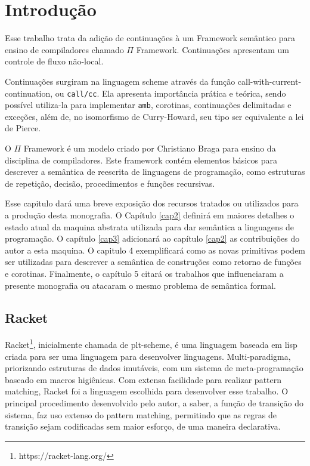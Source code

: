 \chapter{Introdução}


Esse trabalho trata da adição de continuações à um Framework semântico para ensino de compiladores chamado $\Pi$ Framework. Continuações apresentam um controle de fluxo não-local. 

Continuações surgiram na linguagem scheme através da função call-with-current-continuation, ou \texttt{call/cc}. Ela apresenta importância prática e teórica, sendo possível utiliza-la para implementar \texttt{amb}, corotinas, continuações delimitadas e exceções, além de, no isomorfismo de Curry-Howard, seu tipo ser equivalente a lei de Pierce.

O $\Pi$ Framework é um modelo criado por Christiano Braga para ensino da disciplina de compiladores. Este framework contém elementos básicos para descrever a semântica de reescrita de linguagens de programação, como estruturas de repetição, decisão, procedimentos e funções recursivas.

Esse capitulo dará uma breve exposição dos recursos tratados ou utilizados para a produção desta monografia. O Capítulo \ref{cap2} definirá em maiores detalhes o estado atual da maquina abstrata utilizada para dar semântica a linguagens de programação. O capítulo \ref{cap3} adicionará ao capítulo \ref{cap2} as contribuições do autor a esta maquina. O capitulo 4 exemplificará como as novas primitivas podem ser utilizadas para descrever a semântica de construções como retorno de funções e corotinas. Finalmente, o capítulo 5 citará os trabalhos que influenciaram a presente monografia ou atacaram o mesmo problema de semântica formal.

\section{Racket}
Racket\footnote{https://racket-lang.org/}, inicialmente chamada de plt-scheme, é uma linguagem baseada em lisp criada para ser uma linguagem para desenvolver linguagens. Multi-paradigma, priorizando estruturas de dados imutáveis, com um sistema de meta-programação baseado em macros higiênicas. Com extensa facilidade para realizar pattern matching, Racket foi a linguagem escolhida para desenvolver esse trabalho. O principal procedimento desenvolvido pelo autor, a saber, a função de transição do sistema, faz uso extenso do pattern matching, permitindo que as regras de transição sejam codificadas sem maior esforço, de uma maneira declarativa.

